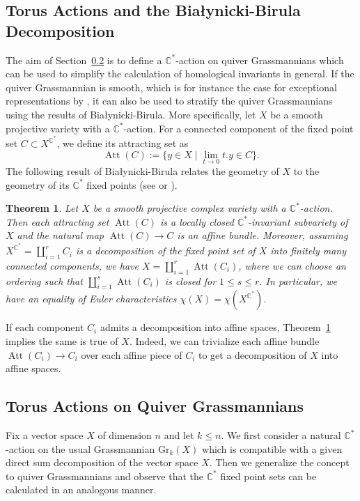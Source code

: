 \documentclass{amsart}
\newtheorem{theorem}{Theorem}[section]
\numberwithin{equation}{section}
\newcommand{\C}{\mathbb{C}}
\newcommand{\CC}{\mathbb{C}}
\newcommand{\Att}{\operatorname{Att}}
\newcommand{\Gr}{\mathrm{Gr}}
\begin{document}
\subsection{Torus Actions and the Bia\l{}ynicki-Birula Decomposition}\label{sec:bb}
The aim of Section~\ref{torusaction} is to define a $\CC^*$-action on quiver Grassmannians which can be used to simplify the calculation of homological invariants in general.
If the quiver Grassmannian is smooth, which is for instance the case for exceptional representations by \cite{cr}, it can also be used to stratify the quiver Grassmannians using the results of Bia\l{}ynicki-Birula.
More specifically, let $X$ be a smooth projective variety with a $\C^\ast$-action.
For a connected component of the fixed point set $C\subset X^{\C^\ast}$, we define its attracting set as
\[\Att(C):=\{y\in X\mid \lim_{t\to 0}t.y\in C\}.\]
The following result of Bia\l{}ynicki-Birula relates the geometry of $X$ to the geometry of its $\CC^*$ fixed points (see \cite[Section 4]{bb} or \cite[Section 4]{ca}).
\begin{theorem}
  \label{thm:bb}
  Let $X$ be a smooth projective complex variety with a $\C^\ast$-action.
  Then each attracting set $\Att(C)$ is a locally closed $\CC^*$-invariant subvariety of $X$ and the natural map $\Att(C)\to C$ is an affine bundle.
  Moreover, assuming $X^{\C^\ast}=\coprod_{i=1}^r C_i$ is a decomposition of the fixed point set of $X$ into finitely many connected components, we have $X=\coprod_{i=1}^r \Att(C_i)$, where we can choose an ordering such that $\coprod_{i=1}^s\Att(C_i)$ is closed for $1\leq s\leq r$.
  In particular, we have an equality of Euler characteristics $\chi(X)=\chi(X^{\C^\ast})$.
\end{theorem}

If each component $C_i$ admits a decomposition into affine spaces, Theorem~\ref{thm:bb} implies the same is true of $X$.
Indeed, we can trivialize each affine bundle $\Att(C_i)\to C_i$ over each affine piece of $C_i$ to get a decomposition of $X$ into affine spaces.


\subsection{Torus Actions on Quiver Grassmannians}
\label{torusaction}
Fix a vector space $X$ of dimension $n$ and let $k\leq n$.
We first consider a natural $\CC^*$-action on the usual Grassmannian $\Gr_k(X)$ which is compatible with a given direct sum decomposition of the vector space $X$.
Then we generalize the concept to quiver Grassmannians and observe that the $\CC^*$ fixed point sets can be calculated in an analogous manner.
\end{document}
